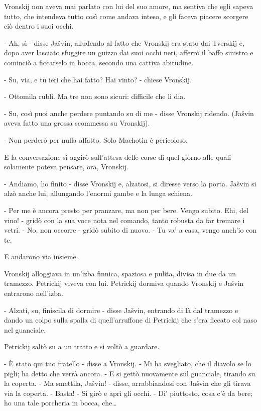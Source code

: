 Vronskij non aveva mai parlato con lui del suo amore, ma sentiva che egli sapeva tutto, che intendeva tutto così come andava inteso, e gli faceva piacere scorgere ciò dentro i suoi occhi. 

- Ah, sì - disse Jašvin, alludendo al fatto che Vronskij era stato dai Tverskij e, dopo aver lasciato sfuggire un guizzo dai suoi occhi neri, afferrò il baffo sinistro e cominciò a ficcarselo in bocca, secondo una cattiva abitudine. 

- Su, via, e tu ieri che hai fatto? Hai vinto? - chiese Vronskij. 

- Ottomila rubli. Ma tre non sono sicuri: difficile che li dia. 

- Su, così puoi anche perdere puntando su di me - disse Vronskij ridendo. (Jašvin aveva fatto una grossa scommessa su Vronskij). 

- Non perderò per nulla affatto. Solo Machotin è pericoloso. 

E la conversazione si aggirò sull'attesa delle corse di quel giorno alle quali solamente poteva pensare, ora, Vronskij. 

- Andiamo, ho finito - disse Vronskij e, alzatosi, si diresse verso la porta. Jašvin si alzò anche lui, allungando l'enormi gambe e la lunga schiena. 

- Per me è ancora presto per pranzare, ma non per bere. Vengo subito. Ehi, del vino! - gridò con la sua voce nota nel comando, tanto robusta da far tremare i vetri. - No, non occorre - gridò subito di nuovo. - Tu va' a casa, vengo anch'io con te. 

E andarono via insieme. 

\label{xx-1} 

Vronskij alloggiava in un'izba finnica, spaziosa e pulita, divisa in due da un tramezzo. Petrickij viveva con lui. Petrickij dormiva quando Vronskij e Jašvin entrarono nell'izba. 

- Alzati, su, finiscila di dormire - disse Jašvin, entrando di là dal tramezzo e dando un colpo sulla spalla di quell'arruffone di Petrickij che s'era ficcato col naso nel guanciale. 

Petrickij saltò su a un tratto e si voltò a guardare. 

- È stato qui tuo fratello - disse a Vronskij. - Mi ha svegliato, che il diavolo se lo pigli; ha detto che verrà ancora. - E si gettò nuovamente sul guanciale, tirando su la coperta. - Ma smettila, Jašvin! - disse, arrabbiandosi con Jašvin che gli tirava via la coperta. - Basta! - Si girò e aprì gli occhi. - Di' piuttosto, cosa c'è da bere; ho una tale porcheria in bocca, che\ldots{} 

